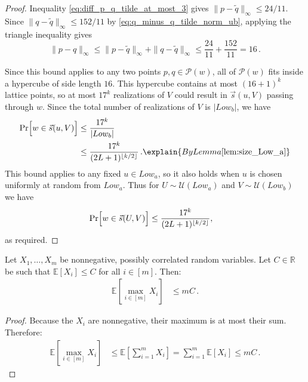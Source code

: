 \documentclass[11pt]{article}
\begin{document}
\begin{proof}
    Inequality \eqref{eq:diff_p_q_tilde_at_most_3} gives $\|p - \widetilde{q}\|_{\infty} \leq 24/11$. Since  $\|q - \widetilde{q}\|_{\infty} \leq 152/11$ by \eqref{eq:q_minus_q_tilde_norm_ub}, applying the triangle inequality gives   
    \begin{equation}
        \|p - q\|_{\infty} \leq \|p - \widetilde{q}\|_{\infty}  + \|q - \widetilde{q}\|_{\infty} \leq \frac{24}{11} + \frac{152}{11} = 16\,.
    \end{equation}

    Since this bound applies to any two points $p, q \in \mathcal{P}(w)$, all of $\mathcal{P}(w)$ fits inside a hypercube of side length $16$. This hypercube contains at most $(16+1)^k$ lattice points, so  at most $17^k$ realizations of $V$ could result in $\vec{s}(u, V)$ passing through $w$. Since the total number of realizations of $V$ is $|Low_b|$, we have 
    \begin{align}
        \Pr\Bigl[w \in \vec{s}(u,V)\Bigr] &\leq \frac{17^k}{|Low_b|} \\
        &\leq \frac{17^k}{(2L+1)^{\lfloor k/2 \rfloor}}\,. \explain{By Lemma \ref{lem:size_Low_a}}
    \end{align}
    This bound applies to any fixed $u \in Low_a$, so it also holds when $u$ is chosen uniformly at random from $Low_a$. Thus for $U \sim \mathcal{U}(Low_a)$ and $V \sim \mathcal{U}(Low_b)$ we have 
    \begin{align}
        \Pr\Bigl[w \in \vec{s}(U, V)\Bigr] &\leq \frac{17^k}{(2L+1)^{\lfloor k/2 \rfloor}},
    \end{align}
    as required.
\end{proof}


\begin{lemma}\label{lem:rv-max-less-than-kc}
    Let $X_1, \ldots, X_m$ be nonnegative, possibly correlated random variables. Let $C \in \mathbb{R}$ be such that $\mathbb{E}[X_i] \leq C$ for all $i \in [m]$. Then:
    \begin{align}
        \mathbb{E}\left[\max_{i \in [m]} X_i\right] &\leq mC \,.
    \end{align}
\end{lemma}

\begin{proof}
    Because the $X_i$ are nonnegative, their maximum is at most their sum. Therefore:
    \begin{align}
        \mathbb{E}\left[\max_{i \in [m]} X_i\right] &\leq \mathbb{E}\left[\sum_{i=1}^m X_i\right] 
        = \sum_{i=1}^m \mathbb{E}[X_i] 
        \leq mC \,.
    \end{align}
\end{proof}
\end{document}
